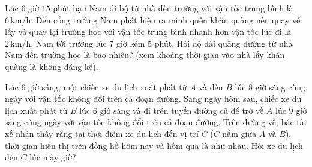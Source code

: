 \begin{bt}%
Lúc $6$ giờ $15$ phút bạn Nam đi bộ từ nhà đến trường với vận tốc trung bình là $6\, \mathrm{km}/\mathrm{h}$. Đến cổng trường Nam phát hiện ra mình quên khăn quàng nên quay về lấy và quay lại trường học với vận tốc trung bình nhanh hơn vận tốc lúc đi là $2\, \mathrm{km}/\mathrm{h}$. Nam tới trường lúc $7$ giờ kém $5$ phút. Hỏi độ dài quãng đường từ nhà Nam đến trường học là bao nhiêu? (xem khoảng thời gian vào nhà lấy khăn quàng là không đáng kể).
\end{bt}

\begin{bt}%
Lúc $6$ giờ sáng, một chiếc xe du lịch xuất phát từ $A$ và đến $B$ lúc $8$ giờ sáng cùng ngày với vận tốc không đổi trên cả đoạn đường. Sang ngày hôm sau, chiếc xe du lịch xuất phát từ $B$ lúc $6$ giờ sáng và đi trên tuyến đường cũ để trở về $A$ lúc $9$ giờ sáng cùng ngày với vận tốc không đổi trên cả đoạn đường. Trên đường về, bác tài xế nhận thấy rằng tại thời điểm xe du lịch đến vị trí $C$ ($C$ nằm giữa $A$ và $B$), thời gian hiển thị trên đồng hồ hôm nay và hôm qua là như nhau. Hỏi xe du lịch đến $C$ lúc mấy giờ?
\end{bt}


